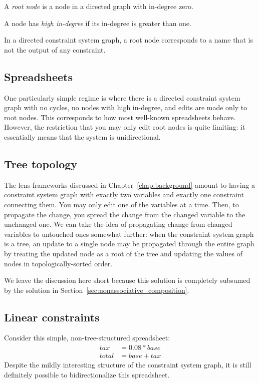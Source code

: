 \begin{definition}
    A \emph{root node} is a node in a directed graph with in-degree zero.
\end{definition}

\begin{definition}
    A node has \emph{high in-degree} if its in-degree is greater than one.
\end{definition}

In a directed constraint system graph, a root node corresponds to a name
that is not the output of any constraint.

\subsection{Spreadsheets}
One particularly simple regime is where there is a directed constraint
system graph with no cycles, no nodes with high in-degree, and edits are
made only to root nodes. This corresponds to how most well-known
spreadsheets behave. However, the restriction that you may only edit root
nodes is quite limiting: it essentially means that the system is
unidirectional.

\subsection{Tree topology}
The lens frameworks discussed in Chapter~\ref{chap:background} amount to having a
constraint system graph with exactly two variables and exactly one
constraint connecting them. You may only edit one of the variables at a
time. Then, to propagate the change, you spread the change from the changed
variable to the unchanged one.
%
We can take the idea of propagating change from changed variables to
untouched ones somewhat further: when the constraint system graph is a tree, an
update to a single node may be propagated through the entire graph by
treating the updated node as a root of the tree and updating the values of
nodes in topologically-sorted order.

We leave the discussion here short because this solution is completely
subsumed by the solution in Section~\ref{sec:nonassociative_composition}.

\subsection{Linear constraints}
\label{sec:linear_constraints}
Consider this simple, non-tree-structured spreadsheet:
\begin{align*}
    tax &= 0.08*base \\
    total &= base + tax
\end{align*}
Despite the mildly interesting structure of the constraint system graph, it
is still definitely possible to bidirectionalize this spreadsheet.

